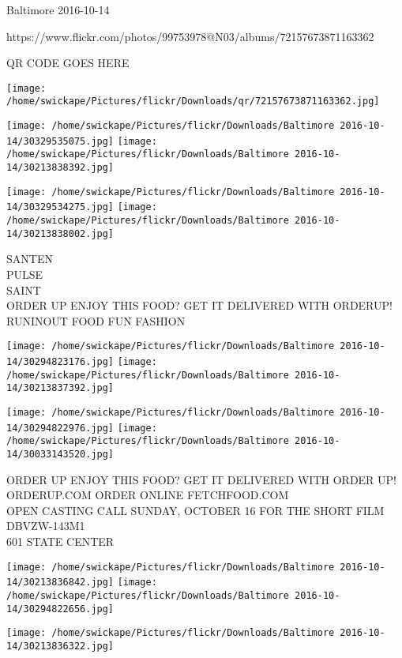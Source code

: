 \documentclass[10pt,letterpaper]{article}
\begin{document}
Baltimore 2016-10-14

https://www.flickr.com/photos/99753978@N03/albums/72157673871163362

QR CODE GOES HERE

\texttt{[image: /home/swickape/Pictures/flickr/Downloads/qr/72157673871163362.jpg]}
\pagebreak

\texttt{[image: /home/swickape/Pictures/flickr/Downloads/Baltimore 2016-10-14/30329535075.jpg]}
\texttt{[image: /home/swickape/Pictures/flickr/Downloads/Baltimore 2016-10-14/30213838392.jpg]}

\texttt{[image: /home/swickape/Pictures/flickr/Downloads/Baltimore 2016-10-14/30329534275.jpg]}
\texttt{[image: /home/swickape/Pictures/flickr/Downloads/Baltimore 2016-10-14/30213838002.jpg]}

SANTEN\\
PULSE\\
SAINT\\
ORDER UP ENJOY THIS FOOD?  GET IT DELIVERED WITH ORDERUP!  RUNINOUT FOOD FUN FASHION\\
\pagebreak

\texttt{[image: /home/swickape/Pictures/flickr/Downloads/Baltimore 2016-10-14/30294823176.jpg]}
\texttt{[image: /home/swickape/Pictures/flickr/Downloads/Baltimore 2016-10-14/30213837392.jpg]}

\texttt{[image: /home/swickape/Pictures/flickr/Downloads/Baltimore 2016-10-14/30294822976.jpg]}
\texttt{[image: /home/swickape/Pictures/flickr/Downloads/Baltimore 2016-10-14/30033143520.jpg]}

ORDER UP ENJOY THIS FOOD?  GET IT DELIVERED WITH ORDER UP!  ORDERUP.COM  ORDER ONLINE FETCHFOOD.COM\\
OPEN CASTING CALL SUNDAY, OCTOBER 16 FOR THE SHORT FILM\\
DBVZW{-}143M1\\
601 STATE CENTER\\
\pagebreak

\texttt{[image: /home/swickape/Pictures/flickr/Downloads/Baltimore 2016-10-14/30213836842.jpg]}
\texttt{[image: /home/swickape/Pictures/flickr/Downloads/Baltimore 2016-10-14/30294822656.jpg]}

\vspace{0.25in}
\texttt{[image: /home/swickape/Pictures/flickr/Downloads/Baltimore 2016-10-14/30213836322.jpg]}
\end{document}
